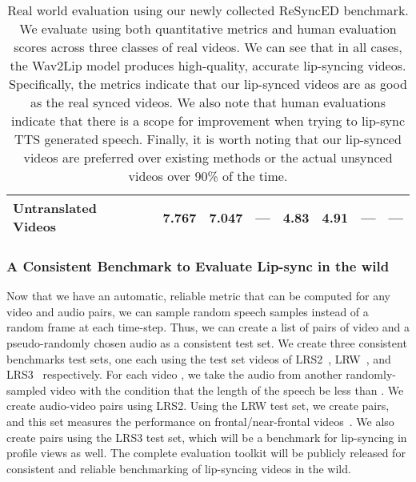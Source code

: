 \documentclass[sigconf]{acmart}
\begin{document}
\begin{table*}[ht]
\begin{tabular}{|l|c|c|c|c||c|c|c|c|}
    Untranslated Videos & & 7.767 & 7.047 & --- & 4.83 & 4.91 & --- & --- \\
    \hline
    \end{tabular}
    \caption{Real world evaluation using our newly collected ReSyncED benchmark. We evaluate using both quantitative metrics and human evaluation scores across three classes of real videos. We can see that in all cases, the Wav2Lip model produces high-quality, accurate lip-syncing videos. Specifically, the metrics indicate that our lip-synced videos are as good as the real synced videos. We also note that human evaluations indicate that there is a scope for improvement when trying to lip-sync TTS generated speech. Finally, it is worth noting that our lip-synced videos are preferred over existing methods or the actual unsynced videos over 90\% of the time.}
    \vspace{-0.7cm}
    \label{tab:realvids}
\end{table*}

\subsubsection{A Consistent Benchmark to Evaluate Lip-sync in the wild}
\label{subsec:consistent}
Now that we have an automatic, reliable metric that can be computed for any video and audio pairs, we can sample random speech samples instead of a random frame at each time-step. Thus, we can create a list of pairs of video and a pseudo-randomly chosen audio as a consistent test set. We create three consistent benchmarks test sets, one each using the test set videos of LRS2~\cite{Afouras18c}, LRW~\cite{chung2016lip}, and LRS3~\cite{afouras2018lrs3} respectively. For each video , we take the audio from another randomly-sampled video  with the condition that the length of the speech  be less than . We create  audio-video pairs using LRS2. Using the LRW test set, we create  pairs, and this set measures the performance on frontal/near-frontal videos~\cite{Afouras18}. We also create  pairs using the LRS3 test set, which will be a benchmark for lip-syncing in profile views as well. The complete evaluation toolkit will be publicly released for consistent and reliable benchmarking of lip-syncing videos in the wild. 
\end{document}
